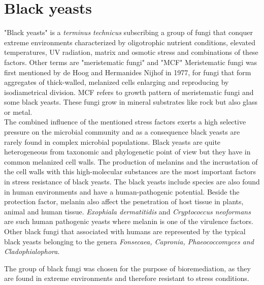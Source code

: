 \documentclass[12pt, a4paper]{report}
\begin{document}
\section{Black yeasts} 
"Black yeasts" is a \textit{terminus technicus} subscribing a group of fungi that conquer extreme environments characterized by oligotrophic nutrient conditions, elevated temperatures, UV radiation, matrix and osmotic stress and combinations of these factors. Other terms are "meristematic fungi" and "MCF" 
Meristematic fungi was first mentioned by de Hoog and Hermanides Nijhof in 1977, for fungi that form aggregates of thick-walled, melanized cells enlarging and reproducing by isodiametrical division. MCF refers to growth pattern of meristematic fungi and some black yeasts. These fungi grow in mineral substrates like rock but also glass or metal.\cite{Sterflinger2006} \\
The combined influence of the mentioned stress factors exerts a high selective pressure on the microbial community and as a consequence black yeasts are rarely found in complex microbial populations. Black yeasts are quite heterogeneous from taxonomic and phylogenetic point of view but they have in common melanized cell walls. The production of melanins and the incrustation of the cell walls with this high-molecular substances are the most important factors in stress resistance of black yeasts. The black yeasts include species are also found in human environments and have a human-pathogenic potential. Beside the protection factor, melanin also affect the penetration of host tissue in plants, animal and human tissue. \textit{Exophiala dermatitidis} and \textit{Cryptococcus neoformans} are such human pathogenic yeasts where melanin is one of the virulence factors. \cite{Hoog2003, Sterflinger2006} Other black fungi that associated with humans are represented by the typical black yeasts belonging to the genera \textit{Fonsecaea, Capronia, Phaeococcomyces and Cladophialophora}. \cite{Blasi2015} 

The group of black fungi was chosen for the purpose of bioremediation, as they are found in extreme environments and therefore resistant to stress conditions. \cite{Poyntner2014} 
\end{document}
